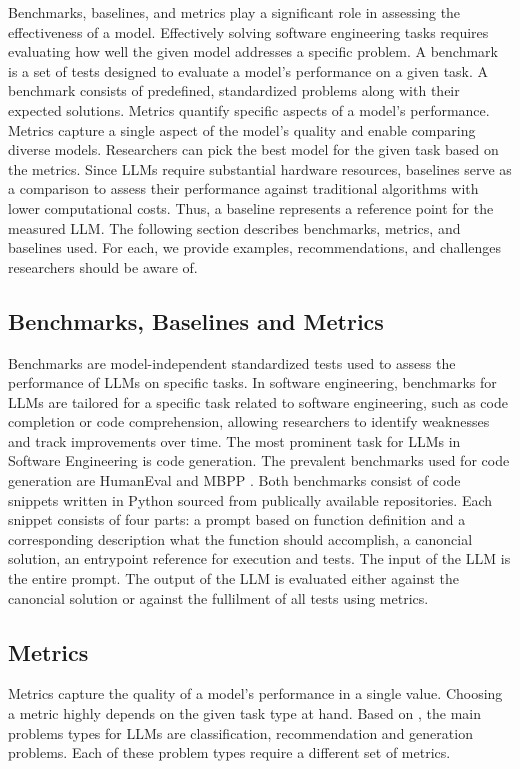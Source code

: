 \documentclass[11pt]{article}
\begin{document}
Benchmarks, baselines, and metrics play a significant role in assessing the effectiveness of a model.
Effectively solving software engineering tasks requires evaluating how well the given model addresses a specific problem.
A benchmark is a set of tests designed to evaluate a model's performance on a given task.
A benchmark consists of predefined, standardized problems along with their expected solutions.
Metrics quantify specific aspects of a model's performance.
Metrics capture a single aspect of the model's quality and enable comparing diverse models.
Researchers can pick the best model for the given task based on the metrics.
Since LLMs require substantial hardware resources, baselines serve as a comparison to assess their performance against traditional algorithms with lower computational costs.
Thus, a baseline represents a reference point for the measured LLM.
The following section describes benchmarks, metrics, and baselines used.
For each, we provide examples, recommendations, and challenges researchers should be aware of.

\subsection{Benchmarks, Baselines and Metrics}

Benchmarks are model-independent standardized tests used to assess the performance of LLMs on specific tasks.
In software engineering, benchmarks for LLMs are tailored for a specific task related to software engineering, such as code completion or code comprehension, allowing researchers to identify weaknesses and track improvements over time.
The most prominent task for LLMs in Software Engineering is code generation.
The prevalent benchmarks used for code generation are HumanEval \cite{TODO} and MBPP \cite{MBPP}.
Both benchmarks consist of code snippets written in Python sourced from publically available repositories.
Each snippet consists of four parts: a prompt based on function definition and a corresponding description what the function should accomplish, a canoncial solution, an entrypoint reference for execution and tests.
The input of the LLM is the entire prompt.
The output of the LLM is evaluated either against the canoncial solution or against the fullilment of all tests using metrics.

\subsection{Metrics}
Metrics capture the quality of a model's performance in a single value.
Choosing a metric highly depends on the given task type at hand.
Based on \cite{10.1145/3695988}, the main problems types for LLMs are classification, recommendation and generation problems.
Each of these problem types require a different set of metrics.
\end{document}
